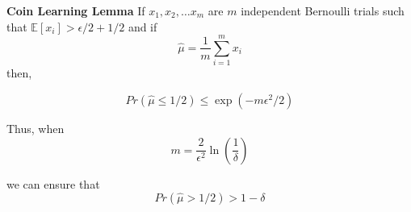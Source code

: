 \begin{lemma} \textbf{Coin Learning Lemma}
\label{lemma:coinlearn}
If $x_1, x_2, \hdots x_m$ are $m$ independent Bernoulli trials such that $\mathbb{E}[x_i] > \epsilon/2 + 1/2$
and if 
\[\hat{\mu} = \frac{1}{m}\displaystyle\sum\limits_{i=1}^{m} x_i
\]		
then, 

\begin{equation}
Pr\left( \hat{\mu} \leq 1/2 \right) \leq  \exp \left( - {m\epsilon^2/2} \right)
\end{equation}

Thus, when 
\begin{equation}
m = \frac{2}{\epsilon^2} \ln \left( \frac{1}{\delta} \right)
\end{equation}


we can ensure that
\begin{equation}
Pr( \hat{\mu} > 1/2) > 1 - \delta
\end{equation}



\end{lemma}

